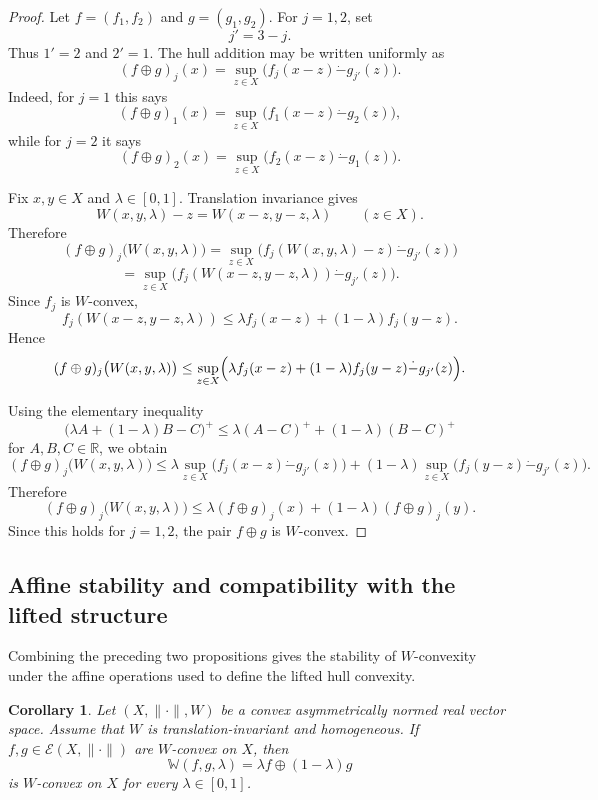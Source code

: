 \documentclass[preprint,12pt]{elsarticle}
\numberwithin{equation}{section}
\newtheorem{corollary}[theorem]{Corollary}
\newcommand{\E}{\mathcal{E}}
\begin{document}
\begin{proof}
Let \(f=(f_1,f_2)\) and \(g=(g_1,g_2)\).  For \(j=1,2\), set
\[
j' = 3-j.
\]
Thus \(1'=2\) and \(2'=1\).  The hull addition may be written uniformly as
\[
(f\oplus g)_j(x)
=
\sup_{z\in X}
\bigl(f_j(x-z)\dot{-}g_{j'}(z)\bigr).
\]
Indeed, for \(j=1\) this says
\[
(f\oplus g)_1(x)
=
\sup_{z\in X}
\bigl(f_1(x-z)\dot{-}g_2(z)\bigr),
\]
while for \(j=2\) it says
\[
(f\oplus g)_2(x)
=
\sup_{z\in X}
\bigl(f_2(x-z)\dot{-}g_1(z)\bigr).
\]

Fix \(x,y\in X\) and \(\lambda\in[0,1]\).  Translation invariance gives
\[
W(x,y,\lambda)-z
=
W(x-z,y-z,\lambda)
\qquad (z\in X).
\]
Therefore
\[
(f\oplus g)_j\bigl(W(x,y,\lambda)\bigr)
=
\sup_{z\in X}
\bigl(
f_j(W(x,y,\lambda)-z)\dot{-}g_{j'}(z)
\bigr)
\]
\[
=
\sup_{z\in X}
\bigl(
f_j(W(x-z,y-z,\lambda))\dot{-}g_{j'}(z)
\bigr).
\]
Since \(f_j\) is \(W\)-convex,
\[
f_j(W(x-z,y-z,\lambda))
\le
\lambda f_j(x-z)+(1-\lambda)f_j(y-z).
\]
Hence
\[
(f\oplus g)_j\bigl(W(x,y,\lambda)\bigr)
\le
\sup_{z\in X}
\Bigl(
\lambda f_j(x-z)+(1-\lambda)f_j(y-z)\dot{-}g_{j'}(z)
\Bigr).
\]

Using the elementary inequality
\[
\bigl(\lambda A+(1-\lambda)B-C\bigr)^+
\le
\lambda(A-C)^+ + (1-\lambda)(B-C)^+
\]
for \(A,B,C\in\mathbb R\), we obtain
\[
(f\oplus g)_j\bigl(W(x,y,\lambda)\bigr)
\le
\lambda
\sup_{z\in X}\bigl(f_j(x-z)\dot{-}g_{j'}(z)\bigr)
+
(1-\lambda)
\sup_{z\in X}\bigl(f_j(y-z)\dot{-}g_{j'}(z)\bigr).
\]
Therefore
\[
(f\oplus g)_j\bigl(W(x,y,\lambda)\bigr)
\le
\lambda (f\oplus g)_j(x)+(1-\lambda)(f\oplus g)_j(y).
\]
Since this holds for \(j=1,2\), the pair \(f\oplus g\) is \(W\)-convex.
\end{proof}

\subsection{Affine stability and compatibility with the lifted structure}

Combining the preceding two propositions gives the stability of
\(W\)-convexity under the affine operations used to define the lifted hull
convexity.

\begin{corollary}\label{cor:affineWconvex}
Let \((X,\|\cdot\|,W)\) be a convex asymmetrically normed real vector space.
Assume that \(W\) is translation-invariant and homogeneous.  If
\(f,g\in\E(X,\|\cdot\|)\) are \(W\)-convex on \(X\), then
\[
\mathbb W(f,g,\lambda)
=
\lambda f\oplus(1-\lambda)g
\]
is \(W\)-convex on \(X\) for every \(\lambda\in[0,1]\).
\end{corollary}
\end{document}
